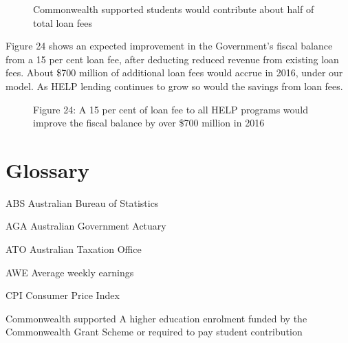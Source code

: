 \documentclass[embargoed]{grattan}
\begin{document}
\begin{figure}
\caption{Commonwealth supported students would contribute about half of total loan fees}\label{fig:fig23-Cth-supported-students-would-contr-half-tot-loan-fees}



\end{figure}

Figure 24 shows an expected improvement in the Government's fiscal balance from a 15 per cent loan fee, after deducting reduced revenue from existing loan fees. About \$700 million of additional loan fees would accrue in 2016, under our model. As HELP lending continues to grow so would the savings from loan fees.

\begin{figure}
\caption{Figure 24: A 15 per cent of loan fee to all HELP programs would improve the fiscal balance by over \$700 million in 2016}\label{fig:fig24-a-15pc-loan-fee-all-HELP-progs-would-improve-fisc-bal-by-over-700M-in-2016}



\end{figure}



\chapter{\texorpdfstring{\protect\hypertarget{_Toc320544430}{}{\protect\hypertarget{_Toc341784486}{}{}}Glossary}{Glossary}}\label{glossary}

ABS Australian Bureau of Statistics

AGA Australian Government Actuary

ATO Australian Taxation Office

AWE Average weekly earnings

CPI Consumer Price Index

Commonwealth supported A higher education enrolment funded by the Commonwealth Grant Scheme or required to pay student contribution
\end{document}
